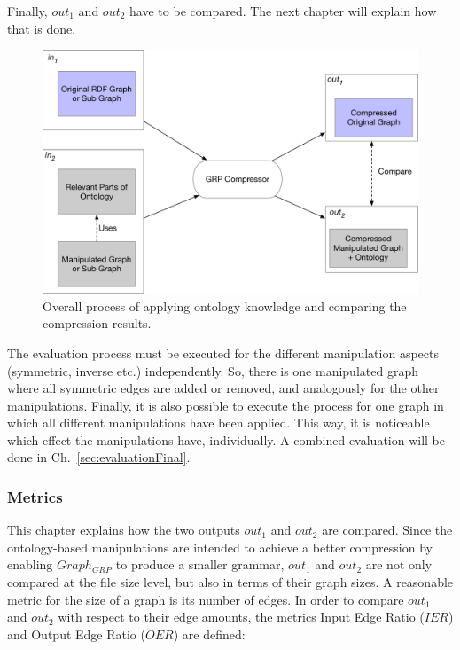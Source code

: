 Finally, $out_1$ and $out_2$ have to be compared. The next chapter will explain how that is done.

\begin{figure}
	\centering
	\includegraphics[width=0.9\linewidth]{figures/4_implementation/overallProcess}
	\caption{Overall process of applying ontology knowledge and comparing the compression results.}
	\label{fig:overallprocess}
\end{figure}

The evaluation process must be executed for the different manipulation aspects (symmetric, inverse etc.) independently. So, there is one manipulated graph where all symmetric edges are added or removed, and analogously for the other manipulations. Finally, it is also possible to execute the process for one graph in which all different manipulations have been applied. This way, it is noticeable which effect the manipulations have, individually. A combined evaluation will be done in Ch.~\ref{sec:evaluationFinal}.

\subsubsection{Metrics}

This chapter explains how the two outputs $out_1$ and $out_2$ are compared. Since the ontology-based manipulations are intended to achieve a better compression by enabling $Graph_{GRP}$ to produce a smaller grammar, $out_1$ and $out_2$ are not only compared at the file size level, but also in terms of their graph sizes. A reasonable metric for the size of a graph is its number of edges. In order to compare $out_1$ and $out_2$ with respect to their edge amounts, the metrics Input Edge Ratio ($IER$) and Output Edge Ratio ($OER$)  are defined: 

